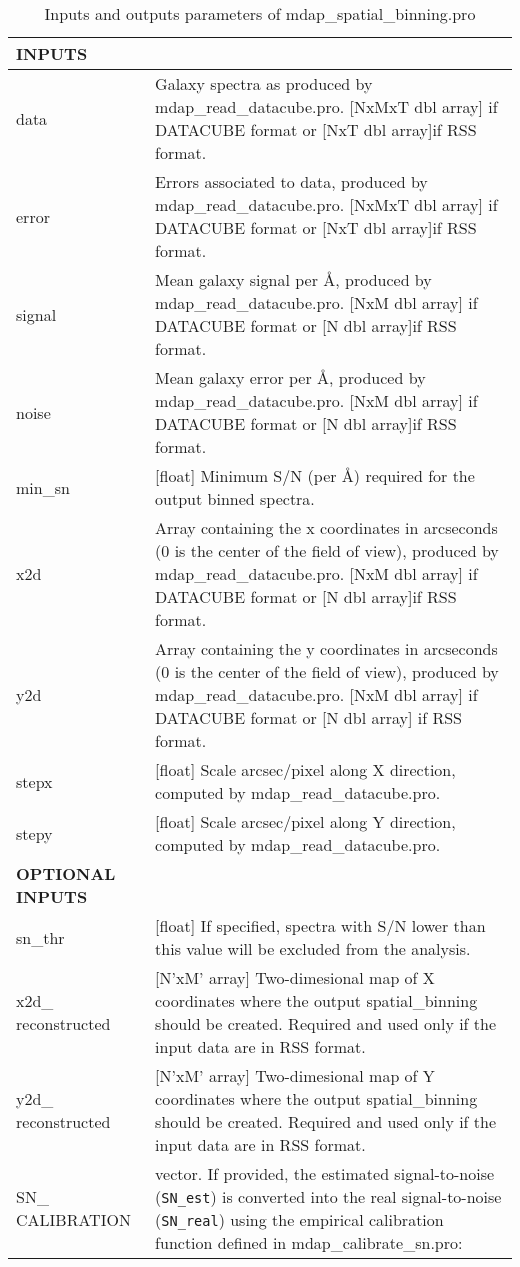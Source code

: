 \begin{center}
\begin{longtable}{p{2.7cm}| p{11.1cm} }
\caption{Inputs and outputs parameters of mdap\_spatial\_binning.pro} \label{dap_tab:mdap_spatial_binning} \\
\hline
\endfirsthead
\hline
\endhead
\hline
\endlastfoot
\hline
{\bf  INPUTS} & \\
\hline
data   &    Galaxy spectra as produced by mdap\_read\_datacube.pro.
           [NxMxT dbl array] if DATACUBE format or [NxT dbl array]if RSS format.\\
%
error  &    Errors associated to data, produced by mdap\_read\_datacube.pro.
           [NxMxT dbl array] if DATACUBE format or [NxT dbl array]if RSS format.\\
%
signal  &   Mean galaxy signal per \AA, produced by mdap\_read\_datacube.pro.
           [NxM dbl array] if DATACUBE format or [N dbl array]if RSS format.\\
%
noise  &    Mean galaxy error per \AA,  produced by mdap\_read\_datacube.pro. 
           [NxM dbl array] if DATACUBE format or [N dbl array]if RSS format.\\
%
min\_sn &    [float] Minimum S/N (per \AA) required for the output binned spectra.\\
%
x2d   &     Array containing the x coordinates in arcseconds (0 is the center of the field of view), produced by  mdap\_read\_datacube.pro.    
            [NxM dbl array] if DATACUBE format or [N dbl array]if RSS format.\\
%
y2d   &     Array containing the y coordinates in arcseconds (0 is the center of the field of view), produced by  mdap\_read\_datacube.pro.    
           [NxM dbl array] if DATACUBE format or [N dbl array] if RSS format.\\
%
stepx  &    [float] Scale arcsec/pixel along X direction, computed by  mdap\_read\_datacube.pro. \\
%
stepy   &   [float] Scale arcsec/pixel along Y direction, computed by  mdap\_read\_datacube.pro. \\
%
\hline
{\bf OPTIONAL INPUTS} & \\
\hline
%
sn\_thr   &  [float] If specified, spectra with S/N lower than this value will be excluded from the analysis. \\ 
%
x2d\_ reconstructed & [N'xM' array] Two-dimesional map of X coordinates where the output spatial\_binning should be created. Required and used only  
                    if the input data are in RSS format. \\
%
y2d\_ reconstructed & [N'xM' array] Two-dimesional map of Y coordinates where the output spatial\_binning should be created. Required and used only 
                    if the input data are in RSS format. \\
%
SN\_ CALIBRATION    & vector. If provided, the estimated signal-to-noise ({\tt SN\_est}) is converted into the real signal-to-noise ({\tt SN\_real}) using the empirical
                  calibration function defined in mdap\_calibrate\_sn.pro:


\end{longtable}
\end{center}
